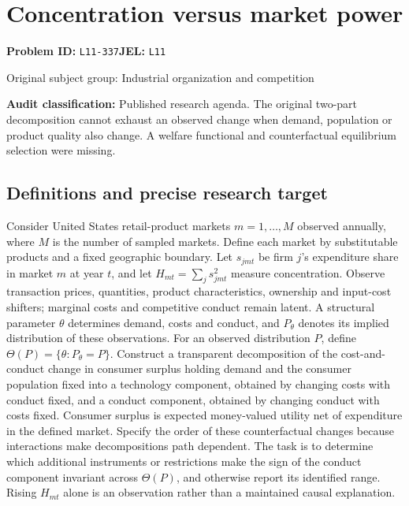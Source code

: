 \documentclass[11pt,a4paper]{article}
\begin{document}
\section*{Concentration versus market power}
\textbf{Problem ID:} \texttt{L11-337}\quad \textbf{JEL:} \texttt{L11}\par
\label{problem:OP-0390}
\label{audited:ECON-033}
{\sffamily\small\color{muted}Original subject group: Industrial organization and competition\par}
\label{definitions:problem:30007672}
\textbf{Audit classification:} Published research agenda. The original two-part decomposition cannot exhaust an observed change when demand, population or product quality also change. A welfare functional and counterfactual equilibrium selection were missing.
\subsection*{Definitions and precise research target}
Consider United States retail-product markets \(m=1,\ldots,M\) observed annually, where \(M\) is the number of sampled markets. Define each market by substitutable products and a fixed geographic boundary. Let \(s_{jmt}\) be firm \(j\)'s expenditure share in market \(m\) at year \(t\), and let \(H_{mt}=\sum_j s_{jmt}^{2}\) measure concentration. Observe transaction prices, quantities, product characteristics, ownership and input-cost shifters; marginal costs and competitive conduct remain latent. A structural parameter \(\theta\) determines demand, costs and conduct, and \(P_\theta\) denotes its implied distribution of these observations. For an observed distribution \(P\), define \(\Theta(P)=\{\theta:P_\theta=P\}\). Construct a transparent decomposition of the cost-and-conduct change in consumer surplus holding demand and the consumer population fixed into a technology component, obtained by changing costs with conduct fixed, and a conduct component, obtained by changing conduct with costs fixed. Consumer surplus is expected money-valued utility net of expenditure in the defined market. Specify the order of these counterfactual changes because interactions make decompositions path dependent. The task is to determine which additional instruments or restrictions make the sign of the conduct component invariant across \(\Theta(P)\), and otherwise report its identified range. Rising \(H_{mt}\) alone is an observation rather than a maintained causal explanation.
\end{document}
